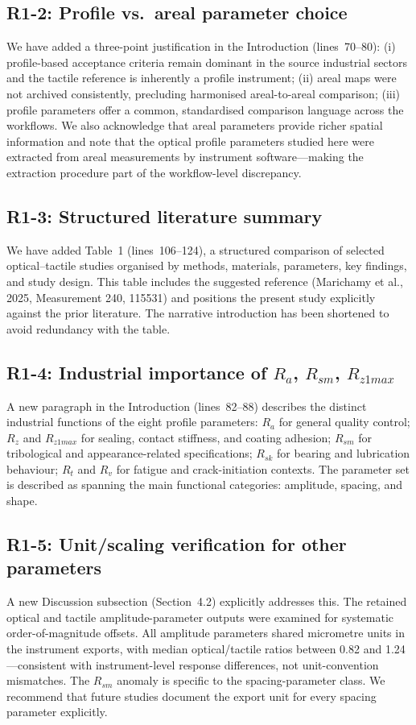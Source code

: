 \documentclass[10pt]{article}
\begin{document}
\subsection*{R1-2: Profile vs.\ areal parameter choice}
We have added a three-point justification in the Introduction (lines~70--80): (i) profile-based acceptance criteria remain dominant in the source industrial sectors and the tactile reference is inherently a profile instrument; (ii) areal maps were not archived consistently, precluding harmonised areal-to-areal comparison; (iii) profile parameters offer a common, standardised comparison language across the workflows. We also acknowledge that areal parameters provide richer spatial information and note that the optical profile parameters studied here were extracted from areal measurements by instrument software---making the extraction procedure part of the workflow-level discrepancy.

\subsection*{R1-3: Structured literature summary}
We have added Table~1 (lines~106--124), a structured comparison of selected optical--tactile studies organised by methods, materials, parameters, key findings, and study design. This table includes the suggested reference (Marichamy et al., 2025, Measurement 240, 115531) and positions the present study explicitly against the prior literature. The narrative introduction has been shortened to avoid redundancy with the table.

\subsection*{R1-4: Industrial importance of $R_a$, $R_{sm}$, $R_{z1max}$}
A new paragraph in the Introduction (lines~82--88) describes the distinct industrial functions of the eight profile parameters: $R_a$ for general quality control; $R_z$ and $R_{z1max}$ for sealing, contact stiffness, and coating adhesion; $R_{sm}$ for tribological and appearance-related specifications; $R_{sk}$ for bearing and lubrication behaviour; $R_t$ and $R_v$ for fatigue and crack-initiation contexts. The parameter set is described as spanning the main functional categories: amplitude, spacing, and shape.

\subsection*{R1-5: Unit/scaling verification for other parameters}
A new Discussion subsection (Section~4.2) explicitly addresses this. The retained optical and tactile amplitude-parameter outputs were examined for systematic order-of-magnitude offsets. All amplitude parameters shared micrometre units in the instrument exports, with median optical/tactile ratios between 0.82 and 1.24---consistent with instrument-level response differences, not unit-convention mismatches. The $R_{sm}$ anomaly is specific to the spacing-parameter class. We recommend that future studies document the export unit for every spacing parameter explicitly.
\end{document}
